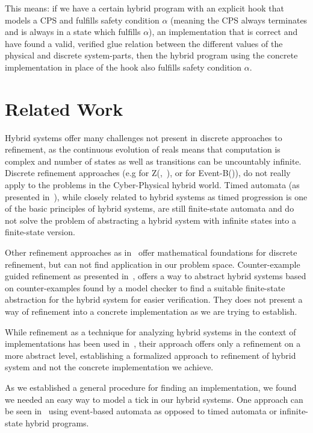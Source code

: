 This means: if we have a certain hybrid program with an explicit hook that models a CPS and fulfills safety condition \(\alpha\) (meaning the CPS always terminates and is always in a state which fulfills \(\alpha\)), an implementation that is correct and have found a valid, verified glue relation between the different values of the physical and discrete system-parts, then the hybrid program using the concrete implementation in place of the hook also fulfills safety condition \(\alpha\).

\section{Related Work}
\label{sec:related}

Hybrid systems offer many challenges not present in discrete approaches to refinement, as the continuous evolution of reals means that computation is complex and number of states as well as transitions can be uncountably infinite. Discrete refinement approaches (e.g for Z(\cite{ZRef},~\cite{ZBookRef}), or for Event-B(\cite{EventB})), do not really apply to the problems in the Cyber-Physical hybrid world. Timed automata (as presented in~\cite{Alur94atheory}), while closely related to hybrid systems as timed progression is one of the basic principles of hybrid systems, are still finite-state automata and do not solve the problem of abstracting a hybrid system with infinite states into a finite-state version.

Other refinement approaches as in~\cite{RefCalcBook} offer mathematical foundations for discrete refinement, but can not find application in our problem space. Counter-example guided refinement as presented in~\cite{CounterExample}, offers a way to abstract hybrid systems based on counter-examples found by a model checker to find a suitable finite-state abstraction for the hybrid system for easier verification. They does not present a way of refinement into a concrete implementation as we are trying to establish.

While refinement as a technique for analyzing hybrid systems in the context of implementations has been used in~\cite{RefCalc}, their approach offers only a refinement on a more abstract level, establishing a formalized approach to refinement of hybrid system and not the concrete implementation we achieve. 

As we established a general procedure for finding an implementation, we found we needed an easy way to model a tick in our hybrid systems. One approach can be seen in~\cite{Raskin96stateclock} using event-based automata as opposed to timed automata or infinite-state hybrid programs.

